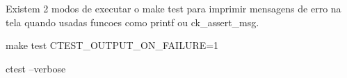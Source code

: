 Existem 2 modos de executar o {\ttfamily make test} para imprimir mensagens de erro na tela quando usadas funcoes como {\ttfamily printf} ou {\ttfamily ck\+\_\+assert\+\_\+msg}.


\begin{DoxyEnumerate}
\item {\ttfamily make test C\+T\+E\+S\+T\+\_\+\+O\+U\+T\+P\+U\+T\+\_\+\+O\+N\+\_\+\+F\+A\+I\+L\+U\+RE=1}
\item ctest --verbose 
\end{DoxyEnumerate}